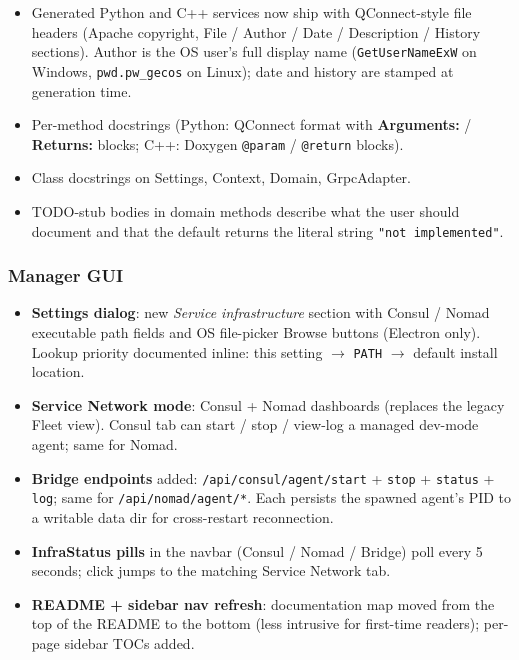 \begin{itemize}
   \item Generated Python and C++ services now ship with QConnect-style
         file headers (Apache copyright, File / Author / Date / Description
         / History sections).  Author is the OS user's full display name
         (\texttt{GetUserNameExW} on Windows, \texttt{pwd.pw\_gecos} on Linux);
         date and history are stamped at generation time.
   \item Per-method docstrings (Python: QConnect format with
         \textbf{Arguments:} / \textbf{Returns:} blocks; C++: Doxygen
         \texttt{@param} / \texttt{@return} blocks).
   \item Class docstrings on Settings, Context, Domain, GrpcAdapter.
   \item TODO-stub bodies in domain methods describe what the user should
         document and that the default returns the literal string
         \texttt{"not implemented"}.
\end{itemize}

\subsubsection{Manager GUI}

\begin{itemize}
   \item \textbf{Settings dialog}: new \emph{Service infrastructure} section
         with Consul / Nomad executable path fields and OS file-picker
         Browse buttons (Electron only).  Lookup priority documented inline:
         this setting $\rightarrow$ \texttt{PATH} $\rightarrow$ default install location.
   \item \textbf{Service Network mode}: Consul + Nomad dashboards (replaces
         the legacy Fleet view).  Consul tab can start / stop / view-log a
         managed dev-mode agent; same for Nomad.
   \item \textbf{Bridge endpoints} added: \texttt{/api/consul/agent/start} +
         \texttt{stop} + \texttt{status} + \texttt{log}; same for
         \texttt{/api/nomad/agent/*}.  Each persists the spawned agent's PID
         to a writable data dir for cross-restart reconnection.
   \item \textbf{InfraStatus pills} in the navbar (Consul / Nomad / Bridge)
         poll every 5 seconds; click jumps to the matching Service Network
         tab.
   \item \textbf{README + sidebar nav refresh}: documentation map moved from
         the top of the README to the bottom (less intrusive for first-time
         readers); per-page sidebar TOCs added.
\end{itemize}

